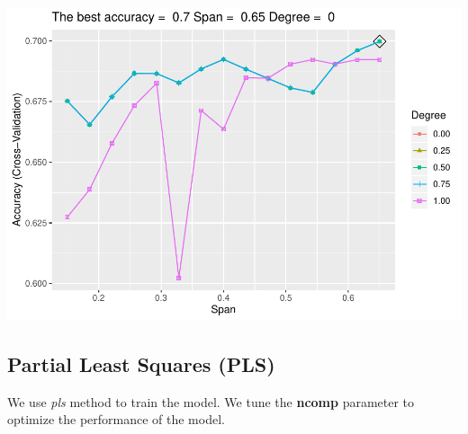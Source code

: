 \documentclass[]{article}
\newenvironment{Shaded}{\begin{snugshade}}{\end{snugshade}}
\newcommand{\CommentTok}[1]{\textcolor[rgb]{0.56,0.35,0.01}{\textit{#1}}}
\newcommand{\DataTypeTok}[1]{\textcolor[rgb]{0.13,0.29,0.53}{#1}}
\newcommand{\KeywordTok}[1]{\textcolor[rgb]{0.13,0.29,0.53}{\textbf{#1}}}
\newcommand{\NormalTok}[1]{#1}
\newcommand{\OperatorTok}[1]{\textcolor[rgb]{0.81,0.36,0.00}{\textbf{#1}}}
\newcommand{\StringTok}[1]{\textcolor[rgb]{0.31,0.60,0.02}{#1}}
\begin{document}
\includegraphics{LiverDisease_files/figure-latex/unnamed-chunk-27-1.pdf}

\begin{Shaded}
\end{Shaded}

\subsection{Partial Least Squares (PLS)}

We use \emph{pls} method to train the model. We tune the \textbf{ncomp}
parameter to optimize the performance of the model.
\end{document}
